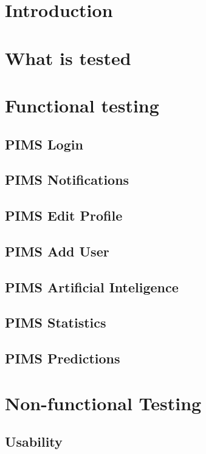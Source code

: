 \documentclass[a4paper,12pt,titlepage]{article}
\begin{document}


\tableofcontents
\newpage




\section{Introduction}

\section{What is tested}

\section{Functional testing}
	\subsection{PIMS Login}
	\subsection{PIMS Notifications}
	\subsection{PIMS Edit Profile}
	\subsection{PIMS Add User}
	\subsection{PIMS Artificial Inteligence}
	\subsection{PIMS Statistics}
	\subsection{PIMS Predictions}
	
	
\section{Non-functional Testing}
	\subsection{Usability}
\end{document}
